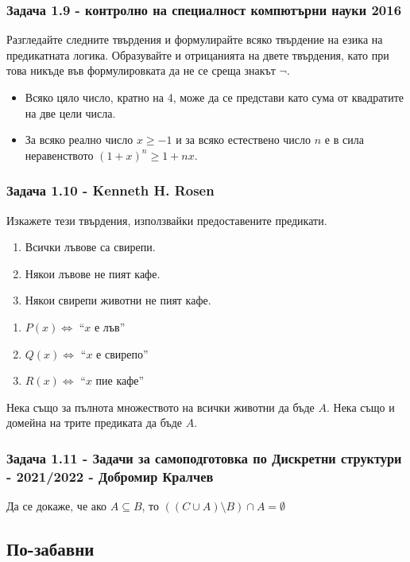 \documentclass[12pt]{article}
\begin{document}
\subsubsection*{Задача 1.9 - контролно на специалност компютърни науки 2016}
Разгледайте следните твърдения и формулирайте всяко твърдение на езика на предикатната логика. Образувайте и отрицанията на двете твърдения, като при това никъде във формулировката да не се среща знакът $\neg$.
\begin{itemize}
    \item Всяко цяло число, кратно на 4, може да се представи като сума от квадратите на две цели числа.
    \item За всяко реално число $x \geq -1$ и за всяко естествено число $n$ е в сила неравенството $(1+x)^n \geq 1 + nx$.  
\end{itemize}

\subsubsection*{Задача 1.10 - Kenneth H. Rosen}
Изкажете тези твърдения, използвайки предоставените предикати.
\begin{enumerate}
    \item Всички лъвове са свирепи.
    \item Някои лъвове не пият кафе.
    \item Някои свирепи животни не пият кафе.
\end{enumerate}
\begin{enumerate}
    \item $P(x) \iff$ ``$x$ е лъв''
    \item $Q(x) \iff$ ``$x$ е свирепо''
    \item $R(x) \iff$ ``$x$ пие кафе''
\end{enumerate} 
Нека също за пълнота множеството на всички животни да бъде $A$. Нека също и домейна на трите предиката да бъде $A$.

\subsubsection*{Задача 1.11 - Задачи за самоподготовка по Дискретни структури - 2021/2022 - Добромир Кралчев}
Да се докаже, че ако $A \subseteq B$, то $((C \cup A) \setminus B) \cap A = \emptyset$

\subsection*{По-забавни}
\end{document}
